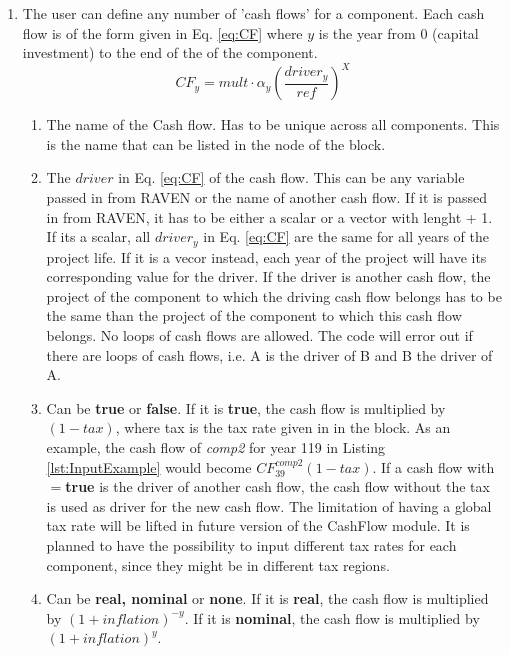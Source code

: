 \begin{enumerate}
\item[\xmlNode{CashFlow}] The user can define any number of 'cash flows' for a component. Each cash flow is of the form given in Eq. \ref{eq:CF} where $y$ is the
 year from 0 (capital investment) to the end of the  of the component.
\begin{equation}\label{eq:CF}
CF_{y}=mult\cdot\alpha_{y}\left ( \frac{driver_{y}}{ref} \right )^{X}
\end{equation}

  \begin{enumerate}
  \item[\xmlAttr{name}] The name of the Cash flow. Has to be unique across all components. This is the name that can be listed in the  node of the  block.
  \item[\xmlAttr{driver}] The $driver$ in Eq. \ref{eq:CF} of the cash flow. This can be any variable passed in from RAVEN or the name of another cash flow. If it is passed in from RAVEN, it has to be either a scalar or a vector with lenght  + 1. If its a scalar, all $driver_{y}$ in Eq. \ref{eq:CF}  are the same for all years of the project life. If it is a vecor instead, each year of the project  will have its corresponding value for the driver. If the driver is another
 cash flow, the project  of the component to which the driving cash flow belongs has to be the same than the project  of the component to which this
 cash flow belongs. No loops of cash flows are allowed. The code will error out if there are loops of cash flows, i.e. A is the driver of B and B the driver of A.
  \item[\xmlAttr{tax}] Can be \textbf{true} or \textbf{false}. If it is \textbf{true}, the cash flow is multiplied by $(1-tax)$, where tax is the tax rate given in  in the 
 block. As an example, the cash flow of \textit{comp2} for year 119 in Listing \ref{lst:InputExample} would become $CF^{comp2}_{39}(1-tax)$.  If a cash flow with $=$\textbf{true} is the driver of another cash flow, the cash flow without the tax is used as driver for the new cash flow. 
The limitation of having a global tax rate will be lifted in future version of the CashFlow module. It is planned to have the possibility to input different tax rates for each component, since they might be in different tax regions.
  \item[\xmlAttr{inflation}] Can be \textbf{real, nominal} or \textbf{none}. If it is \textbf{real}, the cash flow is multiplied by $(1+inflation)^{-y}$. If it is \textbf{nominal}, the cash flow is multiplied by $(1+inflation)^y$. 

\end{enumerate}
\end{enumerate}
